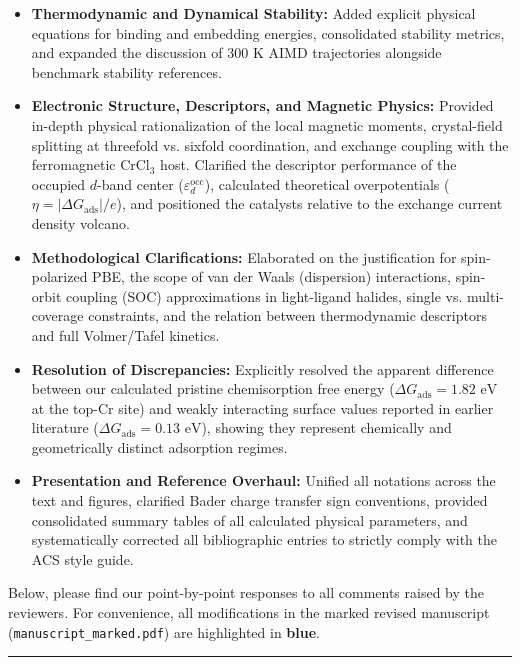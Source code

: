 \documentclass[11pt, sans, a4paper]{moderncv}
\begin{document}
\begin{itemize}[leftmargin=1.5em, itemsep=0.3em]
    \item \textbf{Thermodynamic and Dynamical Stability:} Added explicit physical equations for binding and embedding energies, consolidated stability metrics, and expanded the discussion of $300\text{ K}$ AIMD trajectories alongside benchmark stability references.
    \item \textbf{Electronic Structure, Descriptors, and Magnetic Physics:} Provided in-depth physical rationalization of the local magnetic moments, crystal-field splitting at threefold vs. sixfold coordination, and exchange coupling with the ferromagnetic $\text{CrCl}_3$ host. Clarified the descriptor performance of the occupied $d$-band center ($\varepsilon_d^{\mathrm{occ}}$), calculated theoretical overpotentials ($\eta = |\Delta G_{\mathrm{ads}}|/e$), and positioned the catalysts relative to the exchange current density volcano.
    \item \textbf{Methodological Clarifications:} Elaborated on the justification for spin-polarized PBE, the scope of van der Waals (dispersion) interactions, spin-orbit coupling (SOC) approximations in light-ligand halides, single vs. multi-coverage constraints, and the relation between thermodynamic descriptors and full Volmer/Tafel kinetics.
    \item \textbf{Resolution of Discrepancies:} Explicitly resolved the apparent difference between our calculated pristine chemisorption free energy ($\Delta G_{\mathrm{ads}} = 1.82\text{ eV}$ at the top-Cr site) and weakly interacting surface values reported in earlier literature ($\Delta G_{\mathrm{ads}} = 0.13\text{ eV}$), showing they represent chemically and geometrically distinct adsorption regimes.
    \item \textbf{Presentation and Reference Overhaul:} Unified all notations across the text and figures, clarified Bader charge transfer sign conventions, provided consolidated summary tables of all calculated physical parameters, and systematically corrected all bibliographic entries to strictly comply with the ACS style guide.
\end{itemize}

Below, please find our point-by-point responses to all comments raised by the reviewers. For convenience, all modifications in the marked revised manuscript (\texttt{manuscript\_marked.pdf}) are highlighted in \textbf{\color{blue}blue}.

\vspace{1.5em}
\noindent\rule{\textwidth}{0.6pt}
\end{document}
